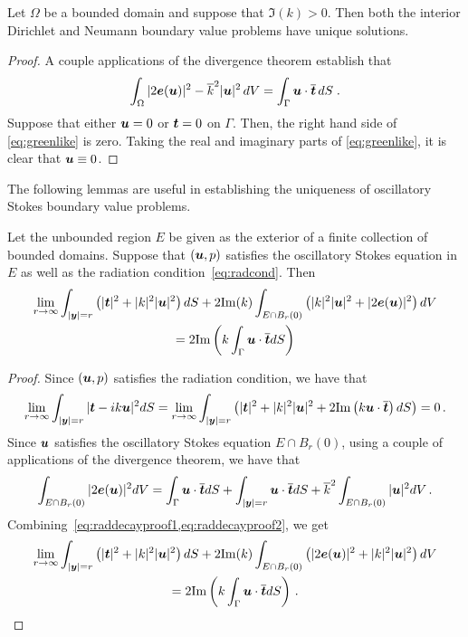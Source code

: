 \begin{thrm}
  Let $\Omega$ be a bounded domain and suppose that
  $\Im (k) > 0$. Then both the interior
  Dirichlet and Neumann boundary value problems have
  unique solutions.
\end{thrm}
\begin{proof}
  A couple applications of the divergence theorem establish
  that
  \begin{equation} \label{eq:greenlike}
    \int_\Omega |2{\boldsymbol e}({\boldsymbol u})|^2 - \overline{k}^2 |{\boldsymbol u}|^2 \, dV
    = \int_\Gamma {\boldsymbol u} \cdot \overline{{\boldsymbol t}} \, dS \; . 
  \end{equation}
  Suppose that either ${\boldsymbol u} = 0$ or ${\boldsymbol t} = 0$ on $\Gamma$.
  Then, the right hand side of \cref{eq:greenlike} is
  zero. Taking the real and imaginary parts of \cref{eq:greenlike},
  it is clear that ${\boldsymbol u} \equiv 0$.
\end{proof}

The following lemmas are useful in establishing the uniqueness
of oscillatory Stokes boundary value problems.

\begin{lem}
  \label{lem:rep}
  Let the unbounded region $E$ be given as the exterior
  of a finite collection of bounded domains.
  Suppose that $({\boldsymbol u},p)$ satisfies the oscillatory Stokes equation in 
  $E$ as well as the radiation condition~\cref{eq:radcond}. 
Then 
\begin{multline}
\label{eq:repinfest}  
\lim_{r\to\infty}
\int_{|{\boldsymbol y}|=r} \left( |{\boldsymbol t}|^2 + |k|^2 |{\boldsymbol u}|^2 \right) dS +
2 {\textrm{\textup{Im}}}(k) \int_{E \cap B_{r}(0)} \left(|k|^2 |{\boldsymbol u}|^2 + |2{\boldsymbol e}({\boldsymbol u})|^2 \right)
dV \\
= 2 {\textrm{\textup{Im}}} \left( k \int_{\Gamma} {\boldsymbol u} \cdot
\overline{{\boldsymbol t}} dS  \right) 
\end{multline}

\end{lem}

\begin{proof}
Since $({\boldsymbol u},p)$ satisfies the radiation condition, we have that
\begin{equation}
\lim_{r\to\infty} \int_{|{\boldsymbol y}|=r} | {\boldsymbol t} - i k {\boldsymbol u}|^2 dS = 
\lim_{r\to\infty} \int_{|{\boldsymbol y}| =r} \left( |{\boldsymbol t}|^2 + |k|^2|{\boldsymbol u}|^2 + 2 {\textrm{\textup{Im}}} 
\left( k {\boldsymbol u}\cdot \overline{{\boldsymbol t}} \right) dS \label{eq:raddecayproof1}
\right) = 0 \, . 
\end{equation}
Since ${\boldsymbol u}$ satisfies the oscillatory Stokes equation $E \cap B_{r}(0)$,
using a couple of applications of the divergence theorem, we have that
\begin{equation}
\int_{E\cap B_{r}(0)} |2 {\boldsymbol e}({\boldsymbol u})|^2 dV =
\int_{\Gamma} {\boldsymbol u} \cdot \overline{{\boldsymbol t}} dS
+ \int_{|{\boldsymbol y}|=r} {\boldsymbol u} \cdot \overline{{\boldsymbol t}} dS + \overline{k}^2 
\int_{E \cap B_{r}(0)} |{\boldsymbol u}|^2 dV \,. \label{eq:raddecayproof2}
\end{equation}
Combining~\cref{eq:raddecayproof1,eq:raddecayproof2}, we get
\begin{multline*}
\lim_{r\to\infty} \int_{|{\boldsymbol y}|=r}\left(|{\boldsymbol t}|^2 + |k|^2 |{\boldsymbol u}|^2 \right) dS 
+ 2 {\textrm{\textup{Im}}}(k)\int_{E \cap B_{r}(0)} \left(|2{\boldsymbol e}({\boldsymbol u})|^2 + |k|^2 |{\boldsymbol u}|^2 
\right) dV \\
= 2{\textrm{\textup{Im}}} \left ( k \int_{\Gamma} {\boldsymbol u} \cdot \overline{{\boldsymbol t}} dS \right) \, .
\end{multline*}
\end{proof}

